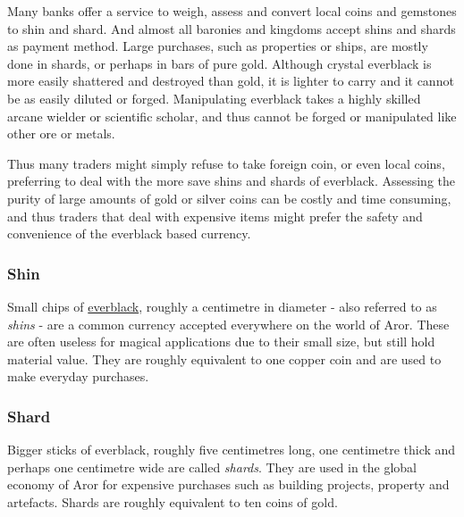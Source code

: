 Many banks offer a service to weigh, assess and convert local coins and
gemstones to shin and shard. And almost all baronies and kingdoms accept shins
and shards as payment method. Large purchases, such as properties or ships, are
mostly done in shards, or perhaps in bars of pure gold. Although crystal
everblack is more easily shattered and destroyed than gold, it is lighter
to carry and it cannot be as easily diluted or forged. Manipulating everblack
takes a highly skilled arcane wielder or scientific scholar, and thus cannot
be forged or manipulated like other ore or metals.

Thus many traders might simply refuse to take foreign coin, or even local
coins, preferring to deal with the more save shins and shards of everblack.
Assessing the purity of large amounts of gold or silver coins can be costly
and time consuming, and thus traders that deal with expensive items might
prefer the safety and convenience of the everblack based currency.

\subsubsection{Shin}
\label{sec:Shin}

Small chips of \hyperref[sec:Everblack]{everblack}, roughly a centimetre in
diameter - also referred to as \emph{shins} - are a common currency accepted
everywhere on the world of Aror. These are often useless for magical
applications due to their small size, but still hold material value. They are
roughly equivalent to one copper coin and are used to make everyday purchases.

\subsubsection{Shard}
\label{sec:Shard}

Bigger sticks of everblack, roughly five centimetres long, one centimetre thick
and perhaps one centimetre wide are called \emph{shards}. They are used in the
global economy of Aror for expensive purchases such as building projects,
property and artefacts. Shards are roughly equivalent to ten coins of gold.
